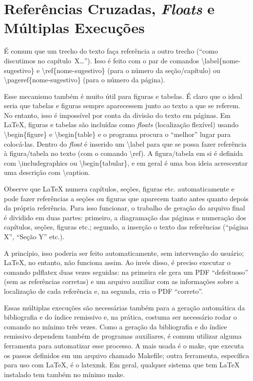 \section{Referências Cruzadas, \emph{Floats} e Múltiplas Execuções}

É comum que um trecho do texto faça referência a outro trecho (``como discutimos
no capítulo~X\ldots''). Isso é feito com o par de comandos
\textsf{\textbackslash{}label\{nome-sugestivo\}} e
\textsf{\textbackslash{}ref\{nome-sugestivo\}} (para o número da
seção/capítulo) ou \textsf{\textbackslash{}pageref\{nome-sugestivo\}}
(para o número da página).

Esse mecanismo também é muito útil para figuras e tabelas.
É claro que o ideal seria que tabelas e figuras sempre aparecessem junto ao
texto a que se referem. No entanto, isso é impossível por conta da divisão
do texto em páginas. Em \LaTeX{}, figuras e tabelas são incluídas como
\emph{floats} (localização flexível) usando \textsf{\textbackslash{}begin\{figure\}}
e \textsf{\textbackslash{}begin\{table\}} e o programa procura o ``melhor''
lugar para colocá-las. Dentro do \emph{float} é inserido um
\textsf{\textbackslash{}label} para que se possa fazer referência à figura/tabela
no texto (com o comando \textsf{\textbackslash{}ref}). A figura/tabela em
si é definida com \textsf{\textbackslash{}includegraphics} ou
\textsf{\textbackslash{}begin\{tabular\}}, e em geral é uma boa ideia acrescentar
uma descrição com \textsf{\textbackslash{}caption}.

Observe que \LaTeX{} numera capítulos, seções, figuras etc. automaticamente
e pode fazer referências a seções ou figuras que aparecem tanto antes
quanto depois da própria referência. Para isso funcionar, o trabalho de
geração do arquivo final é dividido em duas partes: primeiro, a diagramação
das páginas e numeração dos capítulos, seções, figuras etc.; segundo, a
inserção o texto das referências (``página X'', ``Seção Y'' etc.).

A princípio, isso poderia ser feito automaticamente, sem intervenção do
usuário; \LaTeX{}, no entanto, não funciona assim. Ao invés disso, é
preciso executar o comando \textsf{pdflatex} duas vezes seguidas: na
primeira ele gera um PDF ``defeituoso'' (sem as referências corretas) e
um arquivo auxiliar com as informações sobre a localização de cada
referência e, na segunda, cria o PDF ``correto''.

Essas múltiplas execuções são necessárias também para a geração automática
da bibliografia e do índice remissivo e, na prática, costuma ser necessário
rodar o comando no mínimo três vezes. Como a geração da bibliografia e do
índice remissivo dependem também de programas auxiliares, é comum utilizar
alguma ferramenta para automatizar esse processo. A mais usada é o
\textsf{make}, que executa os passos definidos em um arquivo chamado
\textsf{Makefile}; outra ferramenta, específica para uso com
\LaTeX{}, é o \textsf{latexmk}. Em geral, qualquer sistema que tem
\LaTeX{} instalado tem também no mínimo \textsf{make}.

